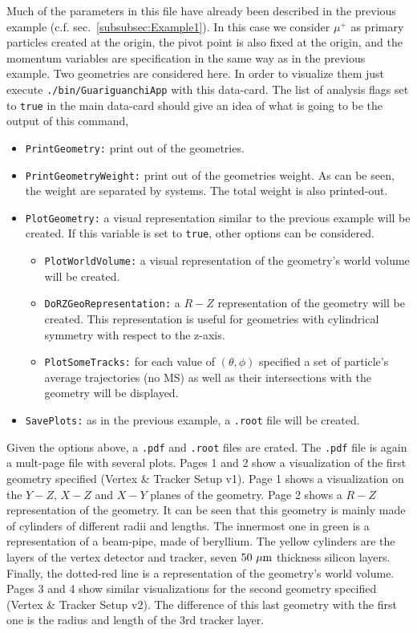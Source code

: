 Much of the parameters in this file have already been described in the previous example (c.f. sec.~\ref{subsubsec:Example1}). 
In this case we consider $\mu^{+}$ as primary particles created at the origin, the pivot point is also fixed at the origin, 
and the momentum variables are specification in the same way as in the previous example. Two geometries are considered here. 
In order to visualize them just execute {\tt ./bin/GuariguanchiApp} with this data-card. The list of analysis flags set to {\tt true} 
in the main data-card should give an idea of what is going to be the output of this command,

\begin{itemize}
 \item  {\tt PrintGeometry:} print out of the geometries.
 
 \item  {\tt PrintGeometryWeight:} print out of the geometries weight. As can be seen, the weight are separated by systems. The 
 total weight is also printed-out.
 
 \item  {\tt PlotGeometry:} a visual representation similar to the previous example will be created. If this variable is set to {\tt true},
 other options can be considered.
 \begin{itemize}
  \item  {\tt PlotWorldVolume:} a visual representation of the geometry's world volume will be created.
  \item  {\tt DoRZGeoRepresentation:} a $R-Z$ representation of the geometry will be created. This representation is useful for 
  geometries with cylindrical symmetry with respect to the z-axis.
  \item  {\tt PlotSomeTracks:} for each value of $(\theta,\phi)$ specified a set of particle's average trajectories (no MS) as well as 
  their intersections with the geometry will be displayed.
 \end{itemize}

 \item  {\tt SavePlots:} as in the previous example, a {\tt .root} file will be created.
\end{itemize}

Given the options above, a {\tt .pdf} and {\tt .root} files are crated. The {\tt .pdf} file is again a mult-page file with several plots. 
Pages 1 and 2 show a visualization of the first geometry specified (Vertex \& Tracker Setup v1). Page 1 shows a visualization on the $Y-Z$, 
$X-Z$ and $X-Y$ planes of the geometry. Page 2 shows a $R-Z$ representation of the geometry. It can be seen that this geometry is mainly 
made of cylinders of different radii and lengths. The innermost one in green is a representation of a beam-pipe, made of beryllium. The yellow 
cylinders are the layers of the vertex detector and tracker, seven $50~{\rm \mu m}$ thickness silicon layers. Finally, the dotted-red 
line is a representation of the geometry's world volume. Pages 3 and 4 show similar visualizations for the second geometry specified (Vertex \& 
Tracker Setup v2). The difference of this last geometry with the first one is the radius and length of the 3rd tracker layer.

